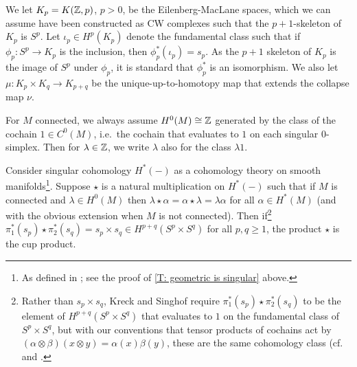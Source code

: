 We let $K_p = K(\mathbb{Z},p)$, $p>0$, be the Eilenberg-MacLane spaces, which we can assume have been constructed as CW complexes such that the $p+1$-skeleton of $K_p$ is $S^p$.
Let $\iota_p \in H^p(K_p)$ denote the fundamental class such that if $\phi_p \colon S^p \to K_p$ is the inclusion, then $\phi_p^*(\iota_p) = s_p$.
As the $p+1$ skeleton of $K_p$ is the image of $S^p$ under $\phi_p$, it is standard that $\phi_p^*$ is an isomorphism.
We also let $\mu \colon K_p \times K_q \to K_{p+q}$ be the unique-up-to-homotopy map that extends the collapse map $\nu$.

For $M$ connected, we always assume $H^0(M) \cong \mathbb{Z}$ generated by the class of the cochain $1 \in C^0(M)$,  i.e.\ the cochain that evaluates to $1$ on each singular $0$-simplex.
Then for $\lambda \in \mathbb{Z}$, we write $\lambda$ also for the class $\lambda 1$.

\begin{proposition}\label{P: Kreck-Singhof pairing}
	Consider singular cohomology $H^*(-)$ as a cohomology theory on smooth manifolds\footnote{As defined in \cite{Krec10b}; see the proof of \cref{T: geometric is singular} above.}.
	Suppose $\star$ is a natural multiplication on $H^*(-)$ such that if $M$ is connected and $\lambda \in H^0(M)$ then $\lambda\star \alpha = \alpha\star \lambda = \lambda\alpha$ for all $\alpha \in H^*(M)$ (and with the obvious extension when $M$ is not connected).
	Then if\footnote{Rather than $s_p \times s_q$, Kreck and Singhof require $\pi_1^*(s_p) \star \pi_2^*(s_q)$ to be the element of $H^{p+q}(S^p \times S^q)$ that evaluates to $1$ on the fundamental class of $S^p \times S^q$, but with our conventions that tensor products of cochains act by $(\alpha \otimes \beta)(x \otimes y) = \alpha(x)\beta(y)$, these are the same cohomology class (cf.\ \cite[page 245]{Span81} and \cite[Section 3B]{Hatc02}.
	} $\pi_1^*(s_p) \star \pi_2^*(s_q) = s_p \times s_q \in H^{p+q}(S^p \times S^q)$ for all $p,q\geq 1$, the product $\star$ is the cup product.
\end{proposition}

